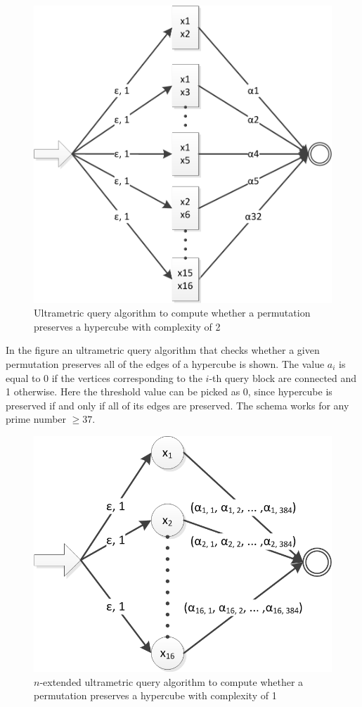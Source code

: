 \documentclass{llncs}
\begin{document}
\begin{figure}
	\centering
	\includegraphics{hypercube_2block.png}
	\caption{Ultrametric query algorithm to compute whether a permutation preserves a hypercube with complexity of 2}
	  \label{hyper2}
\end{figure}

In %
the figure an ultrametric query algorithm that checks whether a given permutation preserves all of the edges of a hypercube is shown. The value $a_i$ is equal to 0 if the vertices corresponding to the $i$-th query block are connected and 1 otherwise. Here the threshold value can be picked as 0, since hypercube is preserved if and only if all of its edges are preserved. The schema works for any prime number $\geq 37$.

\begin{figure}
	\centering
	\includegraphics{hypercube_1block.png}
	\caption{$n$-extended ultrametric query algorithm to compute whether a permutation preserves a hypercube with complexity of 1}
	  \label{hyper1}
\end{figure}
\end{document}
